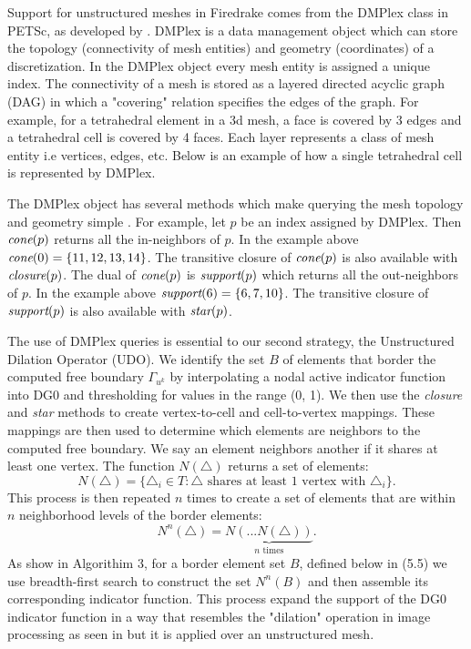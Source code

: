 \documentclass[]{interact}
\theoremstyle{plain}%
\theoremstyle{definition}
\theoremstyle{remark}
\begin{document}
Support for unstructured meshes in Firedrake comes from the DMPlex class in PETSc, as developed by \citet{lange_flexible_2015}. DMPlex is a data management object which can store the topology (connectivity of mesh entities) and geometry (coordinates) of a discretization. In the DMPlex object every mesh entity is assigned a unique index. The connectivity of a mesh is stored as a layered directed acyclic graph (DAG) in which a "covering" relation specifies the edges of the graph. For example, for a tetrahedral element in a 3d mesh, a face is covered by 3 edges and a tetrahedral cell is covered by 4 faces. Each layer represents a class of mesh entity i.e vertices, edges, etc. Below is an example of how a single tetrahedral cell is represented by DMPlex.

The DMPlex object has several methods which make querying the mesh topology and geometry simple \citep{lange_efficient_2016}. For example, let $p$ be an index assigned by DMPlex. Then $\emph{cone}(p)$ returns all the in-neighbors of $p$. In the example above $\emph{cone}(0) = \{11, 12, 13, 14\}$. The transitive closure of $\emph{cone}(p)$ is also available with $\emph{closure}(p)$. The dual of $\emph{cone}(p)$ is $\emph{support}(p)$ which returns all the out-neighbors of $p$. In the example above $\emph{support}(6) = \{6, 7, 10\}$. The transitive closure of $\emph{support}(p)$ is also available with $\emph{star}(p)$. 

The use of DMPlex queries is essential to our second strategy, the Unstructured Dilation Operator (UDO). We identify the set $B$ of elements that border the computed free boundary $\Gamma_{u^k}$ by interpolating a nodal active indicator function into DG0 and thresholding for values in the range (0, 1). We then use the \emph{closure} and \emph{star} methods to create vertex-to-cell and cell-to-vertex mappings. These mappings are then used to determine which elements are neighbors to the computed free boundary. We say an element neighbors another if it shares at least one vertex. The function $N(\triangle)$ returns a set of elements:
\begin{equation}
  N(\triangle) = \{\triangle_i \in T: \triangle \text{ shares at least 1 vertex with } \triangle_i\}.
\end{equation}
This process is then repeated $n$ times to create a set of elements that are within $n$ neighborhood levels of the border elements:
\begin{equation}
  N^n(\triangle) = \underbrace{N(...N(\triangle))}_{n \text{ times}}.
\end{equation}
As show in Algorithim 3, for a border element set $B$, defined below in (5.5) we use breadth-first search to construct the set $N^n(B)$ and then assemble its corresponding indicator function. This process expand the support of the DG0 indicator function in a way that resembles the "dilation" operation in image processing as seen in \citep{OpenCV} but it is applied over an unstructured mesh.
\end{document}
